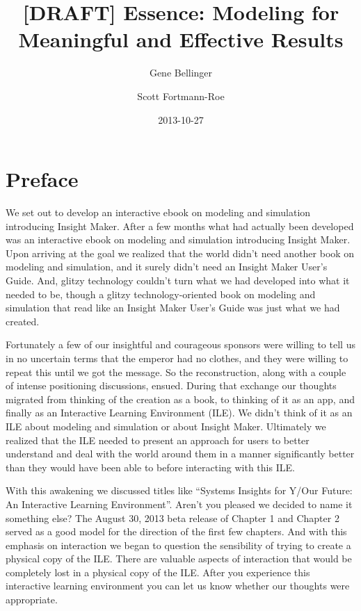 \documentclass[]{memoir}
\title{{[}DRAFT{]} Essence: Modeling for Meaningful and Effective Results}
\author{Gene Bellinger \and Scott Fortmann-Roe}
\date{2013-10-27}
\begin{document}
\maketitle

{
\hypersetup{linkcolor=black}
\setcounter{tocdepth}{1}
\tableofcontents
}
\section{Preface}

We set out to develop an interactive ebook on modeling and simulation
introducing Insight Maker. After a few months what had actually been
developed was an interactive ebook on modeling and simulation
introducing Insight Maker. Upon arriving at the goal we realized that
the world didn't need another book on modeling and simulation, and it
surely didn't need an Insight Maker User's Guide. And, glitzy technology
couldn't turn what we had developed into what it needed to be, though a
glitzy technology-oriented book on modeling and simulation that read
like an Insight Maker User's Guide was just what we had created.

Fortunately a few of our insightful and courageous sponsors were willing
to tell us in no uncertain terms that the emperor had no clothes, and
they were willing to repeat this until we got the message. So the
reconstruction, along with a couple of intense positioning discussions,
ensued. During that exchange our thoughts migrated from thinking of the
creation as a book, to thinking of it as an app, and finally as an
Interactive Learning Environment (ILE). We didn't think of it as an ILE
about modeling and simulation or about Insight Maker. Ultimately we
realized that the ILE needed to present an approach for users to better
understand and deal with the world around them in a manner significantly
better than they would have been able to before interacting with this
ILE.

With this awakening we discussed titles like ``Systems Insights for
Y/Our Future: An Interactive Learning Environment''. Aren't you pleased
we decided to name it something else? The August 30, 2013 beta release
of Chapter 1 and Chapter 2 served as a good model for the direction of
the first few chapters. And with this emphasis on interaction we began
to question the sensibility of trying to create a physical copy of the
ILE. There are valuable aspects of interaction that would be completely
lost in a physical copy of the ILE. After you experience this
interactive learning environment you can let us know whether our
thoughts were appropriate.
\end{document}
